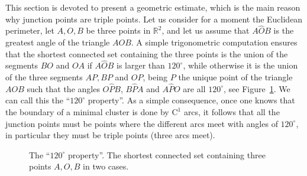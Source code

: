 \documentclass[10pt]{amsart}
\newcommand\R{\mathbb{R}}
\def\angle#1#2#3{#1\widehat{#2}#3}
\theoremstyle{plain}
\theoremstyle{definition}
\begin{document}
This section is devoted to present a geometric estimate, which is the main reason why junction points are triple points. Let us consider for a moment the Euclidean perimeter, let $A,O,B$ be three points in $\R^2$, and let us assume that $\angle AOB$ is the greatest angle of the triangle $AOB$. A simple trigonometric computation ensures that the shortest connected set containing the three points is the union of the segments $BO$ and $OA$ if $\angle AOB$ is larger than $120^\circ$, while otherwise it is the union of the three segments $AP, BP$ and $OP$, being $P$ the unique point of the triangle $AOB$ such that the angles $\angle OPB$, $\angle BPA$ and $\angle APO$ are all $120^\circ$, see Figure~\ref{Fig120}. We can call this the ``$120^\circ$ property''. As a simple consequence, once one knows that the boundary of a minimal cluster is done by $\mathrm{C}^1$ arcs, it follows that all the junction points must be points where the different arcs meet with angles of $120^\circ$, in particular they must be triple points (\ie three arcs meet).\par
\begin{figure}[htbp]
\caption{The ``$120^\circ$ property''. The shortest connected set containing three points $A, O,B$ in two cases.}\label{Fig120}
\end{figure}
\end{document}
